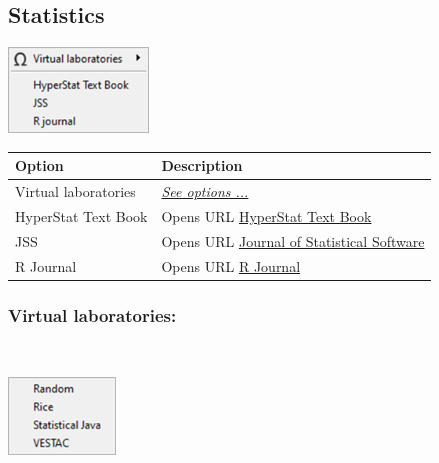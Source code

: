 \hypertarget{menu_web_statistics}{}
\subsection{Statistics}

\includegraphics[scale=0.8]{./res/menu_web_statistics.png}\\

\begin{scriptsize}
  \begin{tabularx}{\textwidth}{>{\hsize=0.5\hsize}X>{\hsize=0.7\hsize}X}\\
    \hline
    \textbf{Option} & \textbf{Description} \\
    \hline
    Virtual laboratories & \textit{\href{\#menu\_web\_statistics\_virtuallabs}{See options ...}} \\
    \hdashline[1pt/1pt]
    HyperStat Text Book & Opens URL \href{http://davidmlane.com/hyperstat/index.html}{HyperStat Text Book} \\
    JSS & Opens URL \href{http://www.jstatsoft.org/}{Journal of Statistical Software} \\
    R Journal & Opens URL \href{http://journal.r-project.org}{R Journal} \\
    \hline
  \end{tabularx}
\end{scriptsize}


\hypertarget{menu_web_statistics_virtuallabs}{}
\subsubsection{Virtual laboratories:}\\

\includegraphics[scale=0.8]{./res/menu_web_statistics_virtuallabs.png}\\


